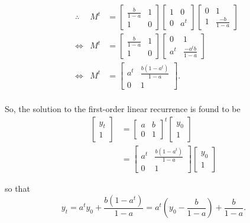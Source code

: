 \documentclass[../MathsNotesBase.tex]{subfiles}
\begin{document}
{		 \begin{align*}
		 &\therefore & M^t &= 
		 	\begin{bmatrix}\frac{b}{1 - a} & 1\\1 & 0\end{bmatrix} 
		 	\begin{bmatrix}1 & 0\\0 & a^t\end{bmatrix}
		 	\begin{bmatrix}0 & 1\\1 & \frac{-b}{1 - a}\end{bmatrix} \\
		 &\iff & M^t &= 
		 	\begin{bmatrix}\frac{b}{1 - a} & 1\\1 & 0\end{bmatrix}
		 	\begin{bmatrix}0 & 1\\a^t & \frac{-a^t b}{1 - a}\end{bmatrix} \\
		 &\iff & M^t &= 
		 	\begin{bmatrix}a^t & \frac{b(1 - a^t)}{1 - a}\\0 & 1\end{bmatrix}. \\
		 \end{align*}
		 
		 So, the solution to the first-order linear recurrence is found to be
		 \begin{align*}
		 \begin{bmatrix}
		 y_t\\
		 1
		 \end{bmatrix} &=
		 \begin{bmatrix}
		 a & b\\
		 0 & 1
		 \end{bmatrix}^t
		 \begin{bmatrix}
		 y_0\\
		 1
		 \end{bmatrix} \\
		 &= \begin{bmatrix}a^t & \frac{b(1 - a^t)}{1 - a}\\0 & 1\end{bmatrix} 
		 \begin{bmatrix}
		 y_0\\
		 1
		 \end{bmatrix}
		 \end{align*}
		 
		 so that 
		 \[ y_t = a^t y_0 + \frac{b(1 - a^t)}{1 - a} = a^t\left(y_0 - \frac{b}{1 - a}\right) + \frac{b}{1 - a}. \]
	
}
\end{document}
